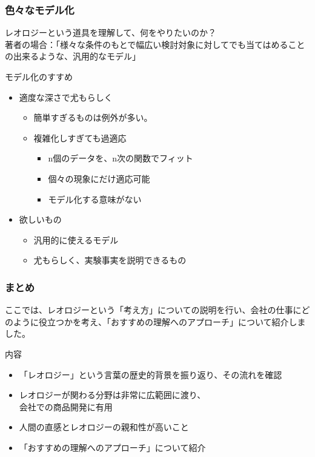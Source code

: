 \documentclass[12pt, dvipdfmx]{beamer}
\begin{document}
\begin{frame}
	\frametitle{色々なモデル化}
	レオロジーという道具を理解して、何をやりたいのか？\\
	著者の場合：「様々な条件のもとで幅広い検討対象に対してでも当てはめることの出来るような、汎用的なモデル」
	\begin{exampleblock}{モデル化のすすめ}
		\begin{itemize}
			\item 適度な深さで尤もらしく
				\begin{itemize}
					\item 簡単すぎるものは例外が多い。
					\item 複雑化しすぎても過適応
						\begin{itemize}
							\item n個のデータを、n次の関数でフィット
							\item 個々の現象にだけ適応可能
							\item モデル化する意味がない
						\end{itemize}
				\end{itemize}
			\item 欲しいもの
				\begin{itemize}
					\item 汎用的に使えるモデル
					\item 尤もらしく、実験事実を説明できるもの
				\end{itemize}
		\end{itemize}
	\end{exampleblock}
\end{frame}

\begin{frame}
	\frametitle{まとめ}
		ここでは、レオロジーという「考え方」についての説明を行い、会社の仕事にどのように役立つかを考え、「おすすめの理解へのアプローチ」について紹介しました。
			\begin{block}{内容}
				\begin{itemize}
					\item 「レオロジー」という言葉の歴史的背景を振り返り、その流れを確認
					\item レオロジーが関わる分野は非常に広範囲に渡り、\\会社での商品開発に有用
					\item 人間の直感とレオロジーの親和性が高いこと
					\item 「おすすめの理解へのアプローチ」について紹介
				\end{itemize}
			\end{block}	
\end{frame}
	
\end{document}
